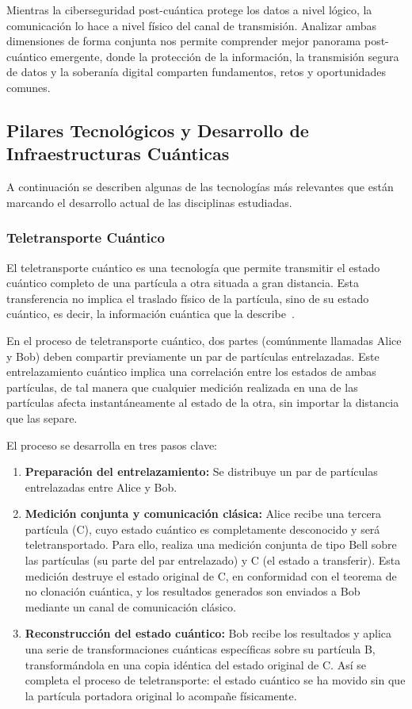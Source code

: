 Mientras la ciberseguridad post-cuántica protege los datos a nivel lógico, la comunicación lo hace a nivel físico del canal de transmisión. Analizar ambas dimensiones de forma conjunta nos permite comprender mejor panorama post-cuántico emergente, donde la protección de la información, la transmisión segura de datos y la soberanía digital comparten fundamentos, retos y oportunidades comunes.

\subsection{Pilares Tecnológicos y Desarrollo de Infraestructuras Cuánticas}

A continuación se describen algunas de las tecnologías más relevantes que están marcando el desarrollo actual de las disciplinas estudiadas.

\subsubsection{Teletransporte Cuántico} %

El teletransporte cuántico es una tecnología que permite transmitir el
estado cuántico completo de una partícula a otra situada a gran distancia. Esta
transferencia no implica el traslado físico de la partícula, sino de su estado
cuántico, es decir, la información cuántica que la describe~\cite{Bennett1993}.

En el proceso de teletransporte cuántico, dos partes (comúnmente llamadas
Alice y Bob) deben compartir previamente un par de partículas entrelazadas. Este entrelazamiento cuántico implica una
correlación entre los estados de ambas partículas, de tal manera que cualquier
medición realizada en una de las partículas afecta instantáneamente al estado
de la otra, sin importar la distancia que las separe.

El proceso se desarrolla en tres pasos clave:
\begin{enumerate}
    \item \textbf{Preparación del entrelazamiento:} Se distribuye un par de partículas entrelazadas entre Alice y Bob.
    \item \textbf{Medición conjunta y comunicación clásica:} Alice recibe una tercera partícula (C), cuyo estado
    cuántico es completamente desconocido y será teletransportado. Para ello,
    realiza una medición conjunta de tipo Bell sobre las partículas (su parte del
    par entrelazado) y C (el estado a transferir). Esta medición destruye el
    estado original de C, en conformidad con el teorema de no clonación cuántica,
    y los resultados generados son enviados a Bob mediante un canal de comunicación
    clásico.
    \item \textbf{Reconstrucción del estado cuántico:} Bob recibe los resultados y aplica una serie de transformaciones cuánticas
    específicas sobre su partícula B, transformándola en una copia idéntica del
    estado original de C. Así se completa el proceso de teletransporte: el estado
    cuántico se ha movido sin que la partícula portadora original lo acompañe
    físicamente.
\end{enumerate}

